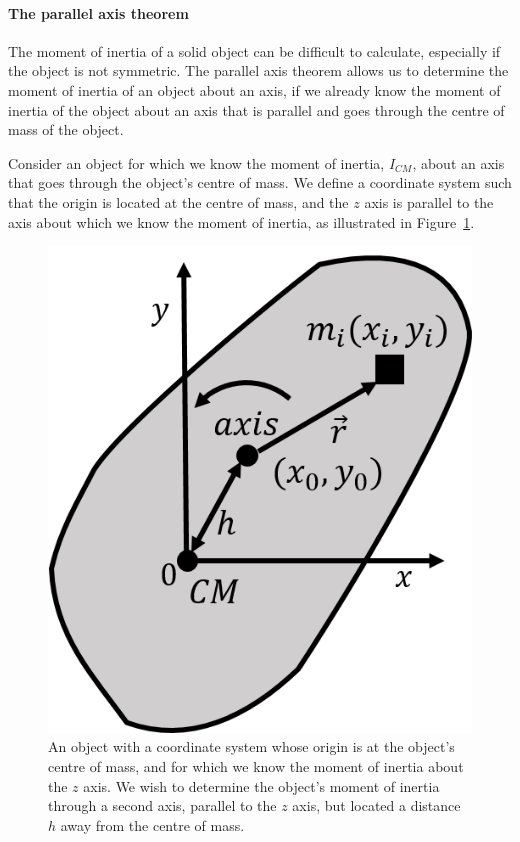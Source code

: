 \paragraph{The parallel axis theorem}

The moment of inertia of a solid object can be difficult to calculate, especially if the object is not symmetric. The parallel axis theorem allows us to determine the moment of inertia of an object about an axis, if we already know the moment of inertia of the object about an axis that is parallel and goes through the centre of mass of the object.

Consider an object for which we know the moment of inertia, $I_{CM}$, about an axis that goes through the object's centre of mass. We define a coordinate system such that the origin is located at the centre of mass, and the $z$ axis is parallel to the axis about which we know the moment of inertia, as illustrated in Figure~\ref{fig:rotationaldynamics:parallel}.

\begin{figure}[!htbp]
\centering
\includegraphics[width=0.375\linewidth]{files/parallel-d3ee8a85ea4e4e83cbf6748bc4b31764.png}
\caption[]{An object with a coordinate system whose origin is at the object's centre of mass, and for which we know the moment of inertia about the $z$ axis. We wish to determine the object's moment of inertia through a second axis, parallel to the $z$ axis, but located a distance $h$ away from the centre of mass.}
\label{fig:rotationaldynamics:parallel}
\end{figure}

